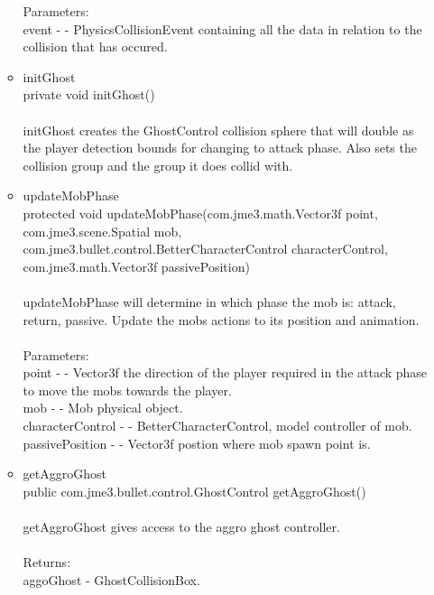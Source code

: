 \documentclass[letterpaper]{article}
\begin{document}
\begin{itemize}
\begin{itemize}
													Parameters: \\
													event - - PhysicsCollisionEvent containing all the data in relation to the collision that has occured. \\
											\item	initGhost \\
													private void initGhost() \\ \\
													initGhost creates the GhostControl collision sphere that will double as the player detection bounds for changing to attack phase. Also sets the collision group and the group it does collid with.
											\item	updateMobPhase \\
													protected void updateMobPhase(com.jme3.math.Vector3f point, \\
				                  com.jme3.scene.Spatial mob, \\
				                  com.jme3.bullet.control.BetterCharacterControl characterControl, \\
				                  com.jme3.math.Vector3f passivePosition) \\ \\
													updateMobPhase will determine in which phase the mob is: attack, return, passive. Update the mobs actions to its position and animation. \\ \\
													Parameters: \\
													point - - Vector3f the direction of the player required in the attack phase to move the mobs towards the player. \\
													mob - - Mob physical object. \\
													characterControl - - BetterCharacterControl, model controller of mob. \\
													passivePosition - - Vector3f postion where mob spawn point is.
											\item	getAggroGhost \\
													public com.jme3.bullet.control.GhostControl getAggroGhost() \\ \\
													getAggroGhost gives access to the aggro ghost controller. \\ \\
													Returns: \\
													aggoGhost - GhostCollisionBox. \\

\end{itemize}
\end{itemize}
\end{document}
